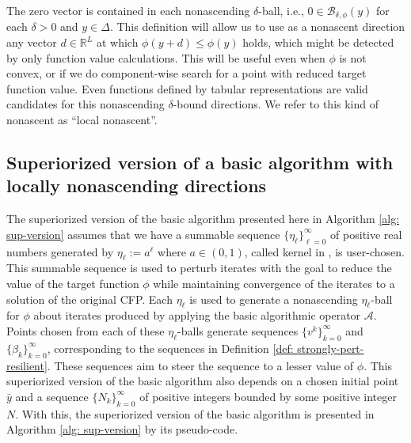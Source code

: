 \documentclass[smallextended]{svjour3}      %
\begin{document}
	The zero vector is contained in each nonascending $\delta$-ball, i.e., $0\in\mathcal{B}_{\delta,\phi}(y)$ for each $\delta>0$ and $y\in\Delta$. This definition will allow us to use as a nonascent direction any vector $d\in \mathbb{R}^{L}$ at which $\phi(y+d)\leq\phi(y)$ holds, which might be detected by only function value calculations. This will be useful even when $\phi$ is not convex, or if we do component-wise search for a point with reduced target function value. Even functions defined by tabular representations are valid candidates for this nonascending $\delta$-bound directions. We refer to this kind of nonascent as ``local nonascent''.


\subsection{Superiorized version of a basic algorithm with locally nonascending
	directions\label{subsec:Superiorized-version-of}}

The superiorized version of the basic algorithm presented here in Algorithm \ref{alg: sup-version} assumes that we have a summable sequence $\lbrace\eta_{\ell}\rbrace_{\ell=0}^{\infty}$ of positive real numbers generated by $\eta_{\ell}:=a^{\ell}$ where $a\in(0,1)$, called kernel in \cite{censorLinSup}, is user-chosen. This summable sequence is used to perturb iterates with the goal to reduce the value of the target function $\phi$ while maintaining convergence of the iterates to a solution of the original CFP. Each $\eta_{\ell}$ is used to generate a nonascending $\eta_{\ell}$-ball for $\phi$ about iterates produced by applying the basic algorithmic operator $\mathcal{A}$. Points chosen from each of these $\eta_{\ell}$-balls generate sequences $\lbrace v^{k}\rbrace_{k=0}^{\infty}$ and $\lbrace\beta_{k}\rbrace_{k=0}^{\infty}$, corresponding to the sequences in Definition \ref{def: strongly-pert-resilient}. These sequences aim to steer the sequence to a lesser value of $\phi$. This superiorized version of the basic algorithm also depends on a chosen initial point $\bar{y}$ and a sequence $\lbrace N_{k}\rbrace_{k=0}^{\infty}$ of positive integers bounded by some positive integer $N$. With this, the superiorized version of the basic algorithm is presented in Algorithm \ref{alg: sup-version} by its pseudo-code.
\end{document}
